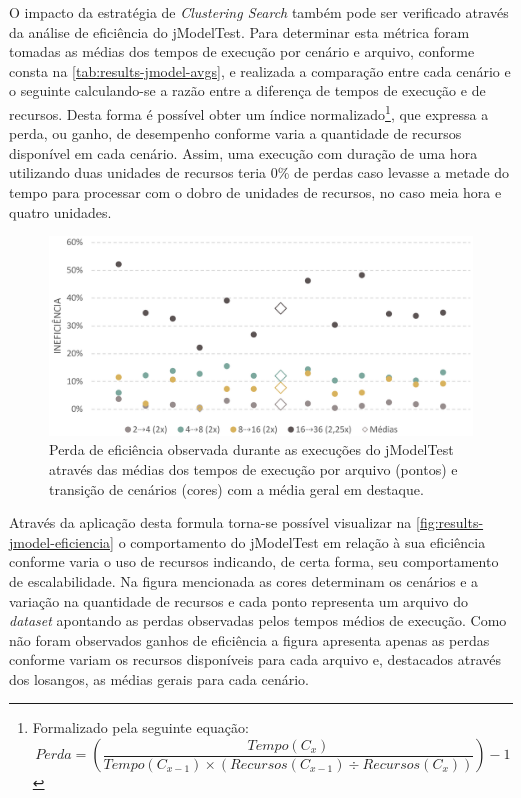 \documentclass[english,brazilian]{UNISINOSmonografia} %
\newcommand\defaultFigureWidth{0.9}
\begin{document}
O impacto da estratégia de \textit{Clustering Search} também pode ser verificado através da análise de eficiência do jModelTest.
%
Para determinar esta métrica foram tomadas as médias dos tempos de execução por cenário e arquivo, conforme consta na \autoref{tab:results-jmodel-avgs}, e realizada a comparação entre cada cenário e o seguinte calculando-se a razão entre a diferença de tempos de execução e de recursos.
%
Desta forma é possível obter um índice normalizado\footnote{
Formalizado pela seguinte equação: 
\[\label{eq:results-jmodel-eficiencia}
Perda = 
\left(
\dfrac
{Tempo(C_{x})}
{Tempo(C_{x-1}) \times \left(
Recursos(C_{x-1}) \div Recursos(C_{x})
\right) }
\right)-1
\]

}, que expressa a perda, ou ganho, de desempenho conforme varia a quantidade de recursos disponível em cada cenário.
%
Assim, uma execução com duração de uma hora utilizando duas unidades de recursos teria 0\% de perdas caso levasse a metade do tempo para processar com o dobro de unidades de recursos, no caso meia hora e quatro unidades.



\begin{figure}[bt]
	\centering%
	\begin{minipage}{\defaultFigureWidth\textwidth}
		\caption{Perda de eficiência observada durante as execuções do jModelTest através das médias dos tempos de execução por arquivo (pontos) e transição de cenários (cores) com a média geral em destaque.}
		\label{fig:results-jmodel-eficiencia}
		\vspace{1ex}
		\includegraphics[width=\textwidth]{results-jmodel-eficiencia}
	\end{minipage}
\end{figure}



Através da aplicação desta formula torna-se possível visualizar na \autoref{fig:results-jmodel-eficiencia} o comportamento do jModelTest em relação à sua eficiência conforme varia o uso de recursos indicando, de certa forma, seu comportamento de escalabilidade.
%
Na figura mencionada as cores determinam os cenários e a variação na quantidade de recursos e cada ponto representa um arquivo do \textit{dataset} apontando as perdas observadas pelos tempos médios de execução.
%
Como não foram observados ganhos de eficiência a figura apresenta apenas as perdas conforme variam os recursos disponíveis para cada arquivo e, destacados através dos losangos, as médias gerais para cada cenário.
\end{document}
